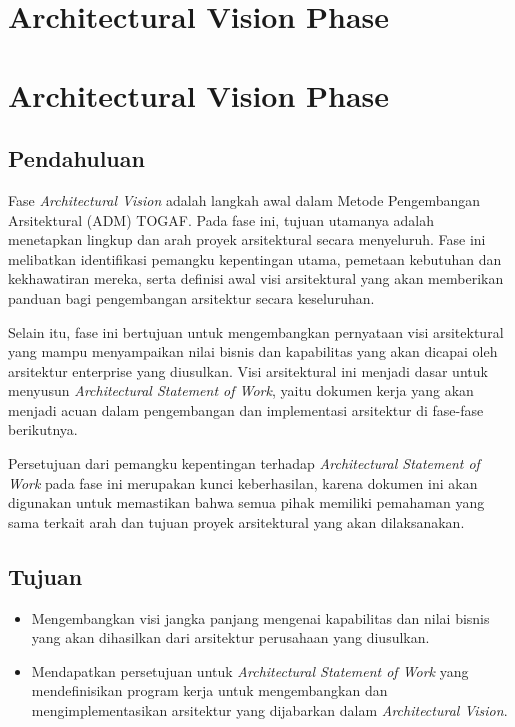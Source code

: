 \chapter{Architectural Vision Phase}


\chapter{Architectural Vision Phase}

\section{Pendahuluan}
Fase \textit{Architectural Vision} adalah langkah awal dalam Metode Pengembangan Arsitektural (ADM) TOGAF. Pada fase ini, tujuan utamanya adalah menetapkan lingkup dan arah proyek arsitektural secara menyeluruh. Fase ini melibatkan identifikasi pemangku kepentingan utama, pemetaan kebutuhan dan kekhawatiran mereka, serta definisi awal visi arsitektural yang akan memberikan panduan bagi pengembangan arsitektur secara keseluruhan.

Selain itu, fase ini bertujuan untuk mengembangkan pernyataan visi arsitektural yang mampu menyampaikan nilai bisnis dan kapabilitas yang akan dicapai oleh arsitektur enterprise yang diusulkan. Visi arsitektural ini menjadi dasar untuk menyusun \textit{Architectural Statement of Work}, yaitu dokumen kerja yang akan menjadi acuan dalam pengembangan dan implementasi arsitektur di fase-fase berikutnya. 

Persetujuan dari pemangku kepentingan terhadap \textit{Architectural Statement of Work} pada fase ini merupakan kunci keberhasilan, karena dokumen ini akan digunakan untuk memastikan bahwa semua pihak memiliki pemahaman yang sama terkait arah dan tujuan proyek arsitektural yang akan dilaksanakan.


\section{Tujuan}
\begin{itemize}
	\item Mengembangkan visi jangka panjang mengenai kapabilitas dan nilai bisnis yang akan dihasilkan dari arsitektur perusahaan yang diusulkan.
	\item Mendapatkan persetujuan untuk \textit{Architectural Statement of Work} yang mendefinisikan program kerja untuk mengembangkan dan mengimplementasikan arsitektur yang dijabarkan dalam \textit{Architectural Vision}.
\end{itemize}

